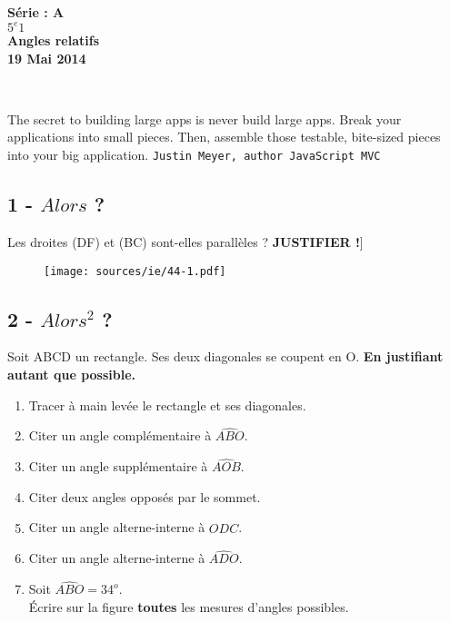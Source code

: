 \documentclass[11pt]{article}
\begin{document}

\begin{minipage}[t]{\textwidth}
  \raggedright
      {\bfseries Série : \textbf{A}}\\
      {\bfseries $5^{e}1$}\\[.35ex]
      \vspace*{-1cm}
      \raggedleft
          {\bfseries Angles relatifs}\\[.35ex]
          {\bfseries 19 Mai 2014}\\[.35ex]
\end{minipage}\\[1em]

\begin{center}
  \textsf{The secret to building large apps is never build large apps. Break your applications into small pieces. Then, assemble those testable, bite-sized pieces into your big application.}
  \texttt{Justin Meyer, author JavaScript MVC}\\
\end{center}

\setlength{\columnseprule}{1pt}
\begin{multicols}{2}
  \subsection*{1 - $Alors$ ?}

  Les droites (DF) et (BC) sont-elles parallèles ? \newline \textbf{JUSTIFIER !}] 
    \begin{figure}[H]
      \centering
      \texttt{[image: sources/ie/44-1.pdf]}
    \end{figure}


    \subsection*{2 - $Alors^{2}$ ?}
    Soit ABCD un rectangle. Ses deux diagonales se coupent en O.
    \textbf{En justifiant autant que possible.}
    \begin{enumerate}
    \item Tracer à main levée le rectangle et ses diagonales.
    \item Citer un angle complémentaire à $\widehat{ABO}$.
    \item Citer un angle supplémentaire à $\widehat{AOB}$.
    \item Citer deux angles opposés par le sommet. 
    \item Citer un angle alterne-interne à  $\widehat{ODC}$.
    \item Citer un angle alterne-interne à  $\widehat{ADO}$.
    \item Soit $\widehat{ABO} = 34^{o}$.\\ Écrire sur la figure \textbf{toutes} les mesures d'angles possibles. 
    \end{enumerate}
\end{multicols}
\end{document}
